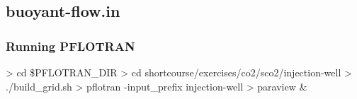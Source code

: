 \documentclass{beamer}
\begin{document}
\subsection{buoyant-flow.in}

\begin{frame}[fragile]\frametitle{Running PFLOTRAN}

\begin{semiverbatim}

> cd \$PFLOTRAN_DIR
> cd shortcourse/exercises/co2/sco2/injection-well
> ./build_grid.sh
> pflotran -input_prefix injection-well
> paraview \&

\end{semiverbatim}

\end{frame}
\end{document}
